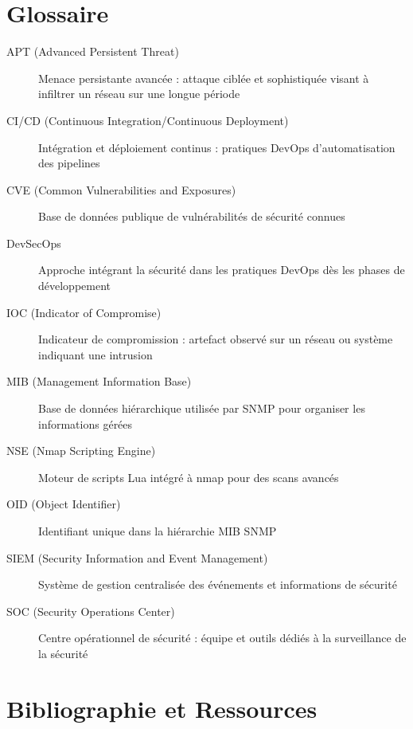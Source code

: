 \documentclass[11pt,a4paper]{report}
\begin{document}
\chapter{Glossaire}

\begin{description}
    \item[APT (Advanced Persistent Threat)] Menace persistante avancée : attaque ciblée et sophistiquée visant à infiltrer un réseau sur une longue période
    
    \item[CI/CD (Continuous Integration/Continuous Deployment)] Intégration et déploiement continus : pratiques DevOps d'automatisation des pipelines
    
    \item[CVE (Common Vulnerabilities and Exposures)] Base de données publique de vulnérabilités de sécurité connues
    
    \item[DevSecOps] Approche intégrant la sécurité dans les pratiques DevOps dès les phases de développement
    
    \item[IOC (Indicator of Compromise)] Indicateur de compromission : artefact observé sur un réseau ou système indiquant une intrusion
    
    \item[MIB (Management Information Base)] Base de données hiérarchique utilisée par SNMP pour organiser les informations gérées
    
    \item[NSE (Nmap Scripting Engine)] Moteur de scripts Lua intégré à nmap pour des scans avancés
    
    \item[OID (Object Identifier)] Identifiant unique dans la hiérarchie MIB SNMP
    
    \item[SIEM (Security Information and Event Management)] Système de gestion centralisée des événements et informations de sécurité
    
    \item[SOC (Security Operations Center)] Centre opérationnel de sécurité : équipe et outils dédiés à la surveillance de la sécurité
\end{description}

\chapter{Bibliographie et Ressources}
\end{document}

